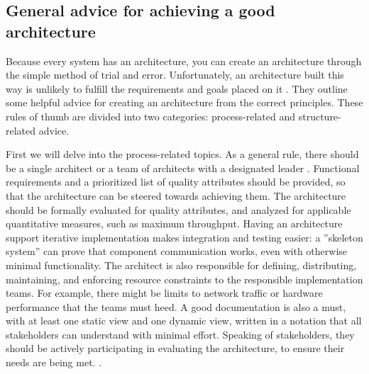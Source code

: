\documentclass[utf8,english]{gradu3}
\begin{document}
\subsection{General advice for achieving a good architecture}

Because every system has an architecture, you can create an architecture through
the simple method of trial and error. Unfortunately, an architecture built this
way is unlikely to fulfill the requirements and goals placed on it
\parencite[24]{Bass1998}. They outline some helpful advice for creating an
architecture from the correct principles. These rules of thumb are divided into
two categories: process-related and structure-related advice.

First we will delve into the process-related topics. As a general rule,
there should be a single architect or a team of architects with a designated
leader \parencite[15]{Bass1998}. Functional requirements and a prioritized list
of quality attributes should be provided, so that the architecture can be steered
towards achieving them. The architecture should be formally evaluated for
quality attributes, and analyzed for applicable quantitative measures, such as
maximum throughput. Having an architecture support iterative implementation
makes integration and testing easier: a ''skeleton system'' can prove that
component communication works, even with otherwise minimal functionality. The
architect is also responsible for defining, distributing, maintaining, and
enforcing resource constraints to the responsible implementation teams. For
example, there might be limits to network traffic or hardware performance that
the teams must heed. A good documentation is also a must, with at least one
static view and one dynamic view, written in a notation that all stakeholders
can understand with minimal effort. Speaking of stakeholders, they should be
actively participating in evaluating the architecture, to ensure their needs are
being met. \parencite[15]{Bass1998}.
\end{document}
